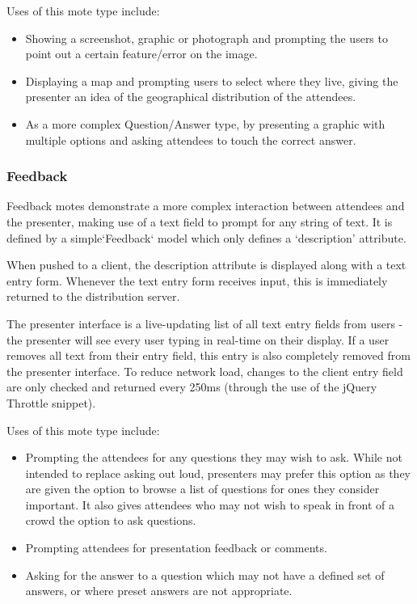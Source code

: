 \documentclass[a4papert,11pt,notitlepage]{article}
\begin{document}
Uses of this mote type include:
\begin{itemize}
\item Showing a screenshot, graphic or photograph and prompting the users to point out a certain feature/error on the image.
\item Displaying a map and prompting users to select where they live, giving the presenter an idea of the geographical distribution of the attendees.
\item As a more complex Question/Answer type, by presenting a graphic with multiple options and asking attendees to touch the correct answer.
\end{itemize}

\subsubsection{Feedback}
Feedback motes demonstrate a more complex interaction between attendees and the presenter, making use of a text field to prompt for any string of text. It is defined by a simple`Feedback` model which only defines a `description' attribute. 

When pushed to a client, the description attribute is displayed along with a text entry form. Whenever the text entry form receives input, this is immediately returned to the distribution server.

The presenter interface is a live-updating list of all text entry fields from users - the presenter will see every user typing in real-time on their display. If a user removes all text from their entry field, this entry is also completely removed from the presenter interface. To reduce network load, changes to the client entry field are only checked and returned every 250ms (through the use of the jQuery Throttle\cite{jquerythrottle:web} snippet).

Uses of this mote type include:
\begin{itemize}
\item Prompting the attendees for any questions they may wish to ask. While not intended to replace asking out loud, presenters may prefer this option as they are given the option to browse a list of questions for ones they consider important. It also gives attendees who may not wish to speak in front of a crowd the option to ask questions.
\item Prompting attendees for presentation feedback or comments.
\item Asking for the answer to a question which may not have a defined set of answers, or where preset answers are not appropriate.
\end{itemize}
\end{document}
